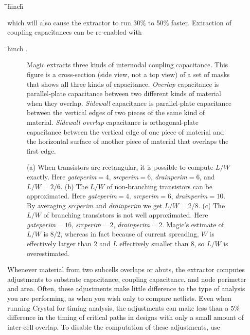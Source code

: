\documentclass[letterpaper,twoside,12pt]{article}
\def\hinch{\hspace*{0.5in}}
\def\starti{\begin{center}\begin{tabbing}\hinch\=\hinch\=\hinch\=hinch\hinch\=\kill}
\def\endi{\end{tabbing}\end{center}}
\def\ii{\>\>\>}
\begin{document}
\starti
   \ii {\bfseries :extract no coupling}
\endi

which will also cause the extractor to run 30\% to 50\% faster.
Extraction of coupling capacitances can be re-enabled with

\starti
   \ii {\bfseries :extract do coupling}.
\endi

\begin{figure}[ht]
   \begin{center}
      \caption{Magic extracts three kinds of internodal coupling
	capacitance.  This figure is a cross-section (side view, not
	a top view) of a set of masks that shows all three kinds of
	capacitance.  {\itshape Overlap} capacitance is parallel-plate
	capacitance between two different kinds of material when they
	overlap.  {\itshape Sidewall} capacitance is parallel-plate
	capacitance between the vertical edges of two pieces of the
	same kind of material.  {\itshape Sidewall overlap} capacitance
	is orthogonal-plate capacitance between the vertical edge of one
	piece of material and the horizontal surface of another piece of
	material that overlaps the first edge.}
   \end{center}
\end{figure}

\begin{figure}[ht]
   \begin{center}
      \caption{
	(a) When transistors are rectangular, it is possible to
	compute $L / W$ exactly.  Here {\itshape gateperim}$=4$,
	{\itshape srcperim}$=6$, {\itshape drainperim}$=6$, and
	$L/W = 2/6$.
	(b) The $L/W$ of non-branching transistors can be approximated.
	Here {\itshape gateperim}$=4$, {\itshape srcperim}$=6$,
	{\itshape drainperim}$=10$.  By averaging {\itshape srcperim}
	and {\itshape drainperim} we get $L/W = 2/8$.
	(c) The $L/W$ of branching transistors is not well approximated.
	Here {\itshape gateperim}$=16$, {\itshape srcperim}$=2$,
	{\itshape drainperim}$=2$.  Magic's estimate of $L/W$ is $8/2$,
	whereas in fact because of current spreading, $W$ is effectively
	larger than $2$ and $L$ effectively smaller than $8$, so $L/W$ is
	overestimated.}
   \end{center}
\end{figure}

Whenever material from two subcells overlaps or abuts, the extractor
computes adjustments to substrate capacitance, coupling
capacitance, and node perimeter and area.  Often, these adjustments
make little difference to the type of analysis you are performing,
as when you wish only to compare netlists.  Even when running
Crystal for timing analysis, the adjustments can make less than
a 5\% difference in the timing of critical paths in designs with
only a small amount of inter-cell overlap.
To disable the computation of these adjustments, use
\end{document}
